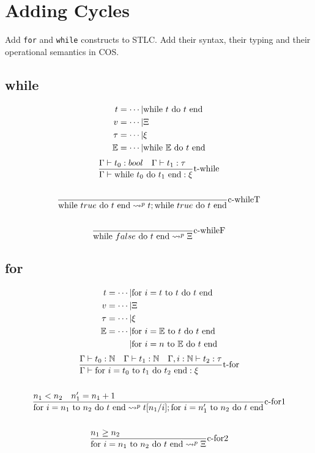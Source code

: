 \documentclass{article}
\begin{document}
\section{Adding Cycles}
Add \texttt{for} and \texttt{while} constructs to STLC. Add their syntax, their typing and their operational
semantics in COS.

\subsection{while}
\begin{align*}
    t = \cdots |& \text{while }t\text{ do }t\text{ end} \\
    v = \cdots |& \Xi \\
    \tau = \cdots |& \xi \\
    \mathbb{E} = \cdots |& \text{while }\mathbb{E}\text{ do }t\text{ end} \\
\end{align*}
\begin{gather*}
    \st[t-while]{\Gamma\vdash \while{t_0}{t_1}: \xi }{\Gamma\vdash t_0:bool \quad \Gamma\vdash t_1:\tau} \\
    \\
    \st[c-whileT]{\while{true}{t} \leadsto^p t;\while{true}{t} }{} \\
    \\
    \st[c-whileF]{\while{false}{t} \leadsto^p \Xi }{}
\end{gather*}

\subsection{for}
\begin{align*}
    t = \cdots |& \text{for }i=t\text{ to }t\text{ do }t\text{ end} \\
    v = \cdots |& \Xi \\
    \tau = \cdots |& \xi \\
    \mathbb{E} = \cdots  |& \text{for }i=\mathbb{E}\text{ to }t\text{ do }t\text{ end} \\
                  |& \text{for }i=n\text{ to }\mathbb{E}\text{ do }t\text{ end} \\
\end{align*}
\begin{gather*}
    \st[t-for]{\Gamma\vdash \for{t_0}{t_1}{t_2}: \xi }{\Gamma\vdash t_0:\N \quad \Gamma\vdash t_1:\N \quad \Gamma,i:\N\vdash t_2:\tau} \\
    \\
    \st[c-for1]{
        \for{n_1}{n_2}{t} \leadsto^p t[n_1/i];\for{n_1'}{n_2}{t}
    }{
        n_1<n_2
        \quad
        n_1' = n_1+1
    } \\
    \\
    \st[c-for2]{
        \for{n_1}{n_2}{t} \leadsto^p \Xi
    }{
        n_1\geq n_2
    } \\
\end{gather*}
\end{document}
